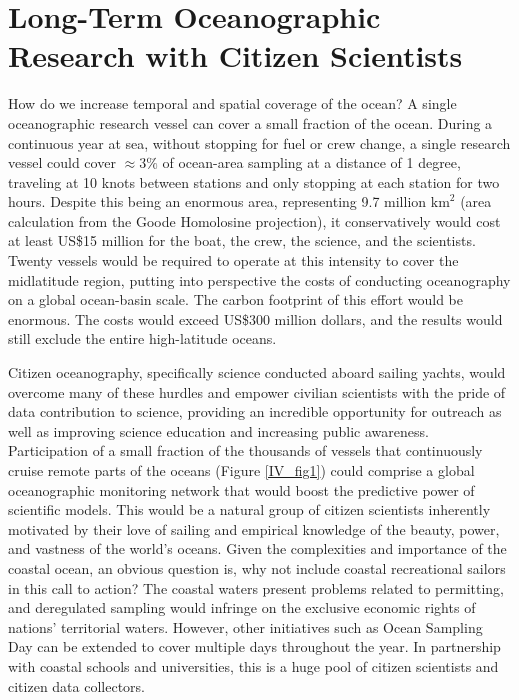 \section{Long-Term Oceanographic Research with Citizen Scientists}

How do we increase temporal and spatial coverage of the ocean? A single oceanographic research vessel can cover a small fraction of the ocean. During a continuous year at sea, without stopping for fuel or crew change, a single research vessel could cover $\approx 3\%$ of ocean-area sampling at a distance of 1 degree, traveling at 10 knots between stations and only stopping at each station for two hours. Despite this being an enormous area, representing 9.7 million $\textrm{km}^2$ (area calculation from the Goode Homolosine projection), it conservatively would cost at least US\$15 million for the boat, the crew, the science, and the scientists. Twenty vessels would be required to operate at this intensity to cover the midlatitude region, putting into perspective the costs of conducting oceanography on a global ocean-basin scale. The carbon footprint of this effort would be enormous. The costs would exceed US\$300 million dollars, and the results would still exclude the entire high-latitude oceans.

Citizen oceanography, specifically science conducted aboard sailing yachts, would overcome many of these hurdles and empower civilian scientists with the pride of data contribution to science, providing an incredible opportunity for outreach as well as improving science education and increasing public awareness. Participation of a small fraction of the thousands of vessels that continuously cruise remote parts of the oceans (Figure \ref{IV_fig1}) could comprise a global oceanographic monitoring network that would boost the predictive power of scientific models. This would be a natural group of citizen scientists inherently motivated by their love of sailing and empirical knowledge of the beauty, power, and vastness of the world's oceans. Given the complexities and importance of the coastal ocean, an obvious question is, why not include coastal recreational sailors in this call to action? The coastal waters present problems related to permitting, and deregulated sampling would infringe on the exclusive economic rights of nations' territorial waters. However, other initiatives such as Ocean Sampling Day \cite{davies_founding_2014} can be extended to cover multiple days throughout the year. In partnership with coastal schools and universities, this is a huge pool of citizen scientists and citizen data collectors.

